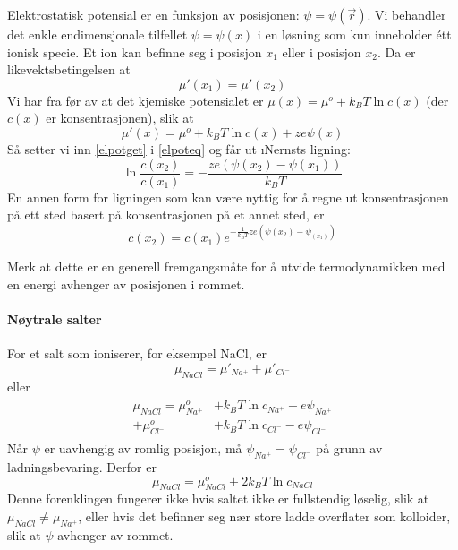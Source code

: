 Elektrostatisk potensial er en funksjon av posisjonen: $\psi = \psi(\vec{r})$. Vi behandler det enkle endimensjonale tilfellet $\psi=\psi(x)$ i en løsning som kun inneholder étt ionisk specie. Et ion kan befinne seg i posisjon $x_1$ eller i posisjon $x_2$. Da er likevektsbetingelsen at
\begin{equation}
	\label{elpoteq}
	\mu'(x_1)=\mu'(x_2)
\end{equation}
Vi har fra før av at det kjemiske potensialet er $\mu(x)=\mu^o+k_BT\ln c(x)$ (der $c(x)$ er konsentrasjonen), slik at
\begin{equation}
	\label{elpotget}
	\mu'(x)=\mu^o+k_BT\ln c(x)+ze\psi(x)
\end{equation}
Så setter vi inn \eqref{elpotget} i \eqref{elpoteq} og får ut \i{Nernsts ligning}:
\begin{equation}
	\label{nernst}
	\ln\frac{c(x_2)}{c(x_1)}=-\frac{ze(\psi(x_2)-\psi(x_1))}{k_BT}
\end{equation}
En annen form for ligningen som kan være nyttig for å regne ut konsentrasjonen på ett sted basert på konsentrasjonen på et annet sted, er
\begin{equation}
	c(x_2)=c(x_1)e^{-\frac{1}{k_BT}ze(\psi(x_2)-\psi_(x_1))}
\end{equation}

Merk at dette er en generell fremgangsmåte for å utvide termodynamikken med en energi avhenger av posisjonen i rommet.

\paragraph{Nøytrale salter} For et salt som ioniserer, for eksempel NaCl, er 
\begin{equation}
	\mu_{NaCl}=\mu'_{Na^+}+\mu'_{Cl^-}
\end{equation}
eller
\begin{align}
\begin{split}
	\mu_{NaCl}=\mu_{Na^+}^o&+k_BT\ln c_{Na^+}+e\psi_{Na^+}\\+\mu_{Cl^-}^o&+k_BT\ln c_{Cl^-}-e\psi_{Cl^-}
\end{split}
\end{align}
Når $\psi$ er uavhengig av romlig posisjon, må $\psi_{Na^+}=\psi_{Cl^-}$ på grunn av ladningsbevaring. Derfor er
\begin{equation}
	\mu_{NaCl}=\mu_{NaCl}^o+2k_BT\ln c_{NaCl}
\end{equation}
Denne forenklingen fungerer ikke hvis saltet ikke er fullstendig løselig, slik at $\mu_{NaCl}\neq\mu_{Na^+}$, eller hvis det befinner seg nær store ladde overflater som kolloider, slik at $\psi$ avhenger av rommet.

